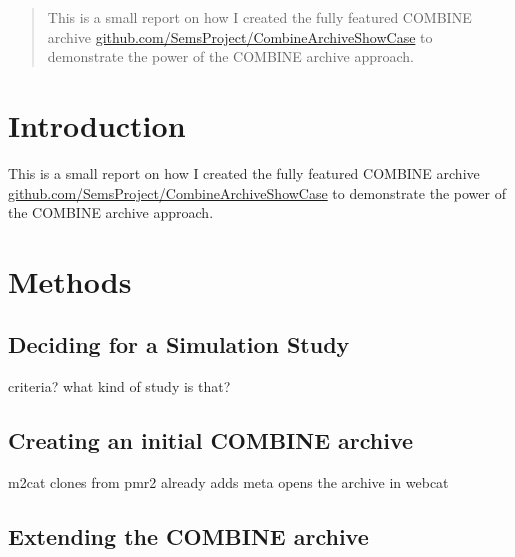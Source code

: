 \documentclass[a4paper,10pt]{scrartcl}
\begin{document}
\maketitle
% 

\begin{abstract}
This is a small report on how I created the fully featured COMBINE archive
\href{https://github.com/SemsProject/CombineArchiveShowCase}{github.com/SemsProject/CombineArchiveShowCase}
to demonstrate the power of the COMBINE archive approach.
\end{abstract}

\section{Introduction}
This is a small report on how I created the fully featured COMBINE archive
\href{https://github.com/SemsProject/CombineArchiveShowCase}{github.com/SemsProject/CombineArchiveShowCase}
to demonstrate the power of the COMBINE archive approach.



\section{Methods}

\subsection{Deciding for a Simulation Study}
criteria?
what kind of study is that?


\subsection{Creating an initial COMBINE archive}
m2cat
clones from pmr2
already adds meta
opens the archive in webcat

\subsection{Extending the COMBINE archive}
\end{document}
